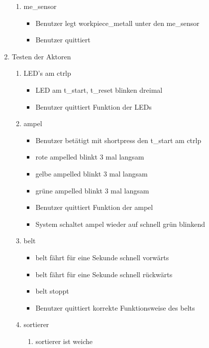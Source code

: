 \begin{enumerate}
\begin{enumerate}
        \item \Gls{me_sensor}
        \begin{itemize}
            \item Benutzer legt \gls{workpiece_metall} unter den \gls{me_sensor}
            \item Benutzer quittiert
        \end{itemize}
    \end{enumerate}
    \item Testen der Aktoren
    \begin{enumerate}
        \item LED's am \gls{ctrlp}
        \begin{itemize}
            \item LED am \gls{t_start}, \gls{t_reset} blinken dreimal
            \item Benutzer quittiert Funktion der LEDs
        \end{itemize}
        \item \Gls{ampel}
        \begin{itemize}
            \item Benutzer betätigt mit \gls{shortpress} den \gls{t_start} am \gls{ctrlp}
            \item rote \gls{ampelled} blinkt 3 mal langsam
            \item gelbe \gls{ampelled} blinkt 3 mal langsam
            \item grüne \gls{ampelled} blinkt 3 mal langsam
            \item Benutzer quittiert Funktion der \gls{ampel}
            \item System schaltet \gls{ampel} wieder auf schnell grün blinkend
        \end{itemize}
        \item \Gls{belt}
        \begin{itemize}
            \item \Gls{belt} fährt für eine Sekunde schnell vorwärts
            \item \Gls{belt} fährt für eine Sekunde schnell rückwärts
            \item \Gls{belt} stoppt
            \item Benutzer quittiert korrekte Funktionsweise des \gls{belt}s
        \end{itemize}
        \item \Gls{sortierer}
        \begin{enumerate}
            \item \Gls{sortierer} ist \gls{weiche}

\end{enumerate}
\end{enumerate}
\end{enumerate}
